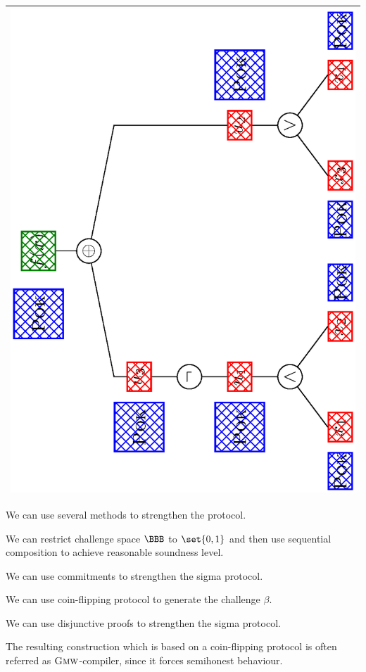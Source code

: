 \documentclass[landscape,dvips,footrule]{foils}
\begin{document}
\begin{center}
\begin{tabular}{|c|}
  \includegraphics[scale=0.18, angle=-90, clip, trim=3.0cm 0.0cm 3.5cm 0.0cm]{augmented-circuit-ii.eps}\\
\hline
\end{tabular}
\end{center}


We can use several methods to strengthen the protocol. 
\begin{triangles}
\item We can restrict challenge space $\BBB$ to $\set{0,1}$ and then
  use sequential composition to achieve reasonable soundness level.
\item We can use commitments to strengthen the sigma protocol.
\item We can use coin-flipping protocol to generate the challenge $\beta$.
\item We can use disjunctive proofs to strengthen the sigma protocol.
\end{triangles}
\Bigskip

The resulting construction which is based on a coin-flipping protocol
is often referred as $\textsc{Gmw}$-compiler, since it forces
semihonest behaviour.
\end{document}
